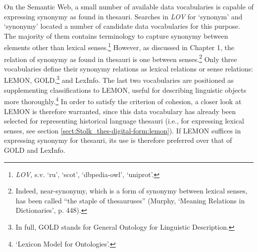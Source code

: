 On the Semantic Web, a small number of available data vocabularies is capable of expressing synonymy as found in thesauri. Searches in \textit{LOV} for `synonym' and `synonymy' located a number of candidate data vocabularies for this purpose. The majority of them contains terminology to capture synonymy between elements other than lexical senses.\footnote{\textit{LOV}, s.v. `ru', `scot', `dbpedia-owl', `uniprot'.} However, as discussed in Chapter 1, the relation of synonymy as found in thesauri is one between senses.\footnote{Indeed, near-synonymy, which is a form of synonymy between lexical senses, has been called ``the staple of thesauruses'' (Murphy, `Meaning Relations in Dictionaries', p. 448).} Only three vocabularies define their synonymy relations as lexical relations or sense relations: LEMON, GOLD,\footnote{In full, GOLD stands for General Ontology for Linguistic Description.} and LexInfo. %
The last two vocabularies are positioned as supplementing classifications to LEMON, useful for describing linguistic objects more thoroughly.\footnote{`Lexicon Model for Ontologies'.} 
In order to satisfy the criterion of cohesion, a closer look at LEMON is therefore warranted, since this data vocabulary has already been selected for representing historical language thesauri (i.e., for expressing lexical senses, see section \ref{sect:Stolk_thes-digital-form:lemon}). 
If LEMON suffices in expressing synonymy for thesauri, its use is therefore preferred over that of GOLD and LexInfo.

